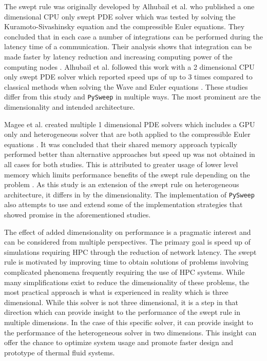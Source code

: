 \documentclass[review]{elsarticle}
\def\pysweep{\texttt{PySweep}}
\begin{document}
\par
The swept rule was originally developed by Alhubail et al. who published a one dimensional CPU only swept PDE solver which was tested by solving the Kuramoto-Sivashinsky equation and the compressible Euler equations. They concluded that in each case a number of integrations can be performed during the latency time of a communication. Their analysis shows that integration can be made faster by latency reduction and increasing computing power of the computing nodes \cite{Alhubail2016ThePDEs}. Alhubail et al. followed this work with a 2 dimensional CPU only swept PDE solver which reported speed ups of up to 3 times compared to classical methods when solving the Wave and Euler equations \cite{Alhubail2018ThePDEs}. These studies differ from this study and \pysweep{} in multiple ways. The most prominent are the dimensionality and intended architecture.
\par
Magee et al. created multiple 1 dimensional PDE solvers which includes a GPU only and heterogeneous solver that are both applied to the compressible Euler equations \cite{Magee2018AcceleratingDecomposition,Magee2020ApplyingSystems}. It was concluded that their shared memory approach typically performed better than alternative approaches but speed up was not obtained in all cases for both studies. This is attributed to greater usage of lower level memory which limits performance benefits of the swept rule depending on the problem \cite{Magee2018AcceleratingDecomposition}. As this study is an extension of the swept rule on heterogeneous architecture, it differs in by the dimensionality. The implementation of \pysweep{} also attempts to use and extend some of the implementation strategies that showed promise in the aforementioned studies.

\par
The effect of added dimensionality on performance is a pragmatic interest and can be considered from multiple perspectives. The primary goal is speed up of simulations requiring HPC through the reduction of network latency. The swept rule is motivated by improving time to obtain solutions of problems involving complicated phenomena frequently requiring the use of HPC systems. While many simplifications exist to reduce the dimensionality of these problems, the most practical approach is what is experienced in reality which is three dimensional. While this solver is not three dimensional, it is a step in that direction which can provide insight to the performance of the swept rule in multiple dimensions. In the case of this specific solver, it can provide insight to the performance of the heterogeneous solver in two dimensions. This insight can offer the chance to optimize system usage and promote faster design and prototype of thermal fluid systems.
\end{document}
